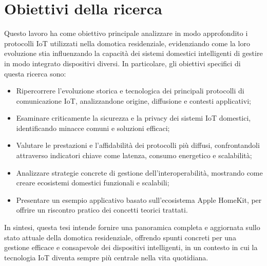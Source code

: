 \section{Obiettivi della ricerca}
Questo lavoro ha come obiettivo principale analizzare in modo approfondito i protocolli IoT utilizzati nella domotica residenziale, evidenziando come la loro evoluzione stia influenzando la capacità dei sistemi domestici intelligenti di gestire in modo integrato dispositivi diversi. In particolare, gli obiettivi specifici di questa ricerca sono:
\begin{itemize}
\item Ripercorrere l'evoluzione storica e tecnologica dei principali protocolli di comunicazione IoT, analizzandone origine, diffusione e contesti applicativi;
\item Esaminare criticamente la sicurezza e la privacy dei sistemi IoT domestici, identificando minacce comuni e soluzioni efficaci;
\item Valutare le prestazioni e l'affidabilità dei protocolli più diffusi, confrontandoli attraverso indicatori chiave come latenza, consumo energetico e scalabilità;
\item Analizzare strategie concrete di gestione dell'interoperabilità, mostrando come creare ecosistemi domestici funzionali e scalabili;
\item Presentare un esempio applicativo basato sull'ecosistema Apple HomeKit, per offrire un riscontro pratico dei concetti teorici trattati.
\end{itemize}

In sintesi, questa tesi intende fornire una panoramica completa e aggiornata sullo stato attuale della domotica residenziale, offrendo spunti concreti per una gestione efficace e consapevole dei dispositivi intelligenti, in un contesto in cui la tecnologia IoT diventa sempre più centrale nella vita quotidiana.
